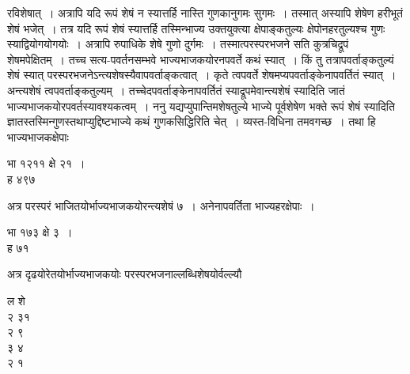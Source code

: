 \documentclass[11pt, openany]{book}
\begin{document}
\newpage

\begin{sloppypar}
\noindent रविशेषात्~। अत्रापि यदि रूपं शेषं न स्यात्तर्हि नास्ति गुणकानुगमः सुगमः~। तस्मात् अस्यापि शेषेण हरीभूतं शेषं भजेत्~। तत्र यदि रूपं शेषं स्यात्तर्हि तस्मिन्भाज्य उक्तयुक्त्या क्षेपाङ्कतुल्यः क्षेपोनहरतुल्यश्च गुणः स्याद्वियोगयोगयोः~। अत्रापि रुपाधिके शेषे गुणो दुर्गमः~। तस्मात्परस्परभजने सति कुत्रचिद्रूपं शेषमपेक्षितम्~। तच्च सत्य-पवर्तनसम्भवे भाज्यभाजकयोरनपवर्ते कथं स्यात्~। किं तु तत्रापवर्ताङ्कतुल्यं शेषं स्यात् परस्परभजनेऽन्त्यशेषस्यैवापवर्ताङ्कत्वात्~। कृते त्वपवर्ते शेषमप्यपवर्ताङ्केनापवर्तितं स्यात्~। अन्त्यशेषं त्वपवर्ताङ्कतुल्यम्~। तच्चेदपवर्ताङ्केनापवर्तितं स्याद्रूपमेवान्त्यशेषं स्यादिति जातं भाज्यभाजकयोरपवर्तस्यावश्यकत्वम्~। ननु यद्यप्युपान्तिमशेषतुल्ये भाज्ये पूर्वशेषेण भक्ते रूपं शेषं स्यादिति ज्ञातस्तस्मिन्गुणस्तथाप्युद्दिष्टभाज्ये कथं गुणकसिद्धिरिति चेत्~। व्यस्त-विधिना तमवगच्छ~। तथा हि\textendash \,भाज्यभाजकक्षेपाः
\vspace{-1mm}

\begin{center}
भा १२११ क्षे २१~।\\
ह ४९७ ~~~~~~~~~~~~
\end{center}
\vspace{-1mm}

\noindent अत्र परस्परं भाजितयोर्भाज्यभाजकयोरन्त्यशेषं ७~। अनेनापवर्तिता भाज्यहरक्षेपाः~। 
\vspace{-1mm}

\begin{center}
भा १७३ क्षे ३~।\\
ह ७१ ~~~~~~~~~~~
\end{center}
\vspace{-1mm}

\noindent अत्र दृढयोरेतयोर्भाज्यभाजकयोः परस्परभजनाल्लब्धिशेषयोर्वल्ल्यौ
\vspace{-1mm}

\begin{center}
ल \hspace{6mm} शे\\
२ \hspace{5mm} ३१\\
२ \hspace{7mm} ९\\
३ \hspace{7mm} ४\\
२ \hspace{7mm} १
\end{center}
\vspace{-1mm}


\end{sloppypar}
\end{document}
